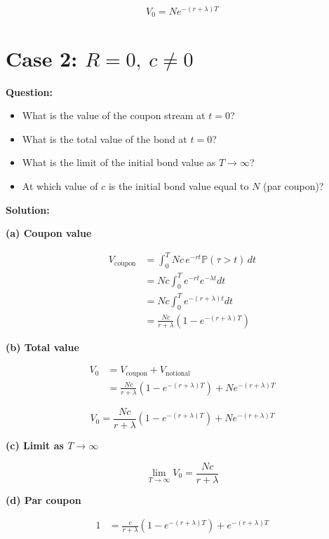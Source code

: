 \documentclass{article}
\begin{document}
\[
\boxed{V_0 = N e^{-(r+\lambda)T}}
\]


\section*{Case 2: $R = 0,\ c \neq 0$}

\textbf{Question:}
\begin{itemize}
    \item[(a)] What is the value of the coupon stream at $t = 0$?
    \item[(b)] What is the total value of the bond at $t = 0$?
    \item[(c)] What is the limit of the initial bond value as $T \to \infty$?
    \item[(d)] At which value of $c$ is the initial bond value equal to $N$ (par coupon)?
\end{itemize}

\vspace{4pt}

\textbf{Solution:}

\textbf{(a) Coupon value}

\begin{align*}
V_{\text{coupon}}
&= \int_0^T Nc \, e^{-rt} \mathbb{P}(\tau > t)\, dt \\
&= Nc \int_0^T e^{-rt} e^{-\lambda t} dt \\
&= Nc \int_0^T e^{-(r+\lambda)t} dt \\
&= \frac{Nc}{r+\lambda}\left(1 - e^{-(r+\lambda)T}\right)
\end{align*}

\textbf{(b) Total value}

\begin{align*}
V_0
&= V_{\text{coupon}} + V_{\text{notional}} \\
&= \frac{Nc}{r+\lambda}\left(1 - e^{-(r+\lambda)T}\right)
+ N e^{-(r+\lambda)T}
\end{align*}

\[
\boxed{
V_0 =
\frac{Nc}{r+\lambda}\left(1 - e^{-(r+\lambda)T}\right)
+ N e^{-(r+\lambda)T}
}
\]

\textbf{(c) Limit as $T \to \infty$}

\[
\boxed{
\lim_{T \to \infty} V_0 = \frac{Nc}{r+\lambda}
}
\]

\textbf{(d) Par coupon}

\begin{align*}
1
&= \frac{c}{r+\lambda}\left(1 - e^{-(r+\lambda)T}\right)
+ e^{-(r+\lambda)T}
\end{align*}
\end{document}
